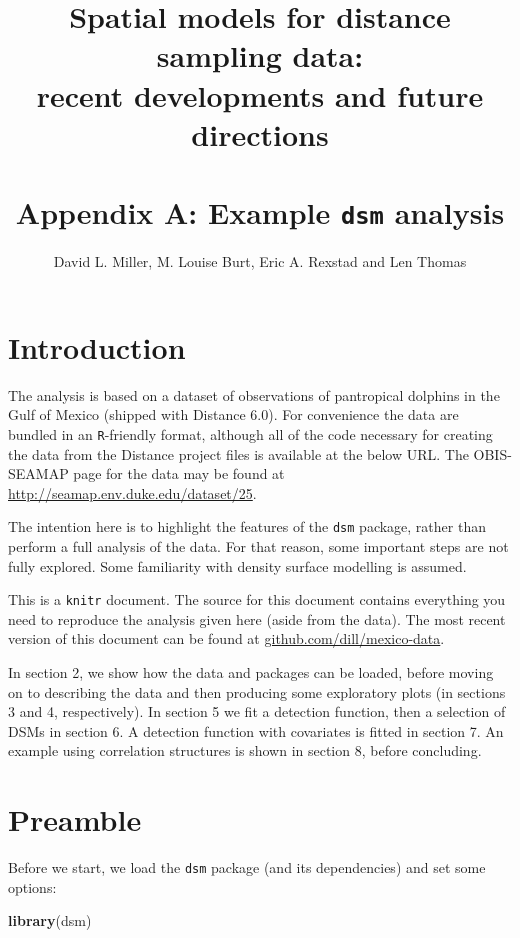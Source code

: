 \documentclass[]{amsart}
\title[Appendix A: Example \texttt{dsm} analysis]{{\Small Spatial models for distance sampling data:\\ recent developments and future directions}\\ \mbox{} \\Appendix A: Example \texttt{dsm} analysis}
\author{David L. Miller, M. Louise Burt, Eric A. Rexstad and Len Thomas}
\date{}
\newenvironment{Shaded}{}{}
\newcommand{\KeywordTok}[1]{\textcolor[rgb]{0.00,0.44,0.13}{\textbf{{#1}}}}
\newcommand{\NormalTok}[1]{{#1}}
\begin{document}
\maketitle


\section{Introduction}

The analysis is based on a dataset of observations of pantropical
dolphins in the Gulf of Mexico (shipped with Distance 6.0). For
convenience the data are bundled in an \texttt{R}-friendly format,
although all of the code necessary for creating the data from the
Distance project files is available at the below URL. The OBIS-SEAMAP
page for the data may be found at
\url{http://seamap.env.duke.edu/dataset/25}.

The intention here is to highlight the features of the \texttt{dsm}
package, rather than perform a full analysis of the data. For that
reason, some important steps are not fully explored. Some familiarity
with density surface modelling is assumed.

This is a \texttt{knitr} document. The source for this document contains
everything you need to reproduce the analysis given here (aside from the
data). The most recent version of this document can be found at
\href{http://github.com/dill/mexico-data}{github.com/dill/mexico-data}.

In section 2, we show how the data and packages can be loaded, before moving on to describing the data and then producing some exploratory plots (in sections 3 and 4, respectively). In section 5 we fit a detection function, then a selection of DSMs in section 6. A detection function with covariates is fitted in section 7. An example using correlation structures is shown in section 8, before concluding.

\section{Preamble}

Before we start, we load the \texttt{dsm} package (and its dependencies)
and set some options:

\begin{Shaded}
\begin{Highlighting}[]
\KeywordTok{library}\NormalTok{(dsm)}
\end{Highlighting}
\end{Shaded}
\end{document}
